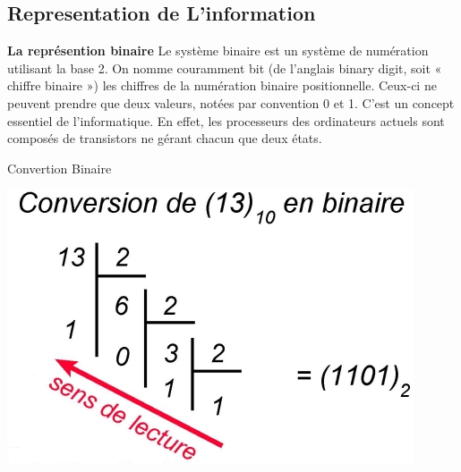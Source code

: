 \documentclass[a4paper, 12pt]{beamer}
\begin{document}
	\subsection{Representation de L'information}
	\begin{frame}
		\begin{block}{\textbf{La représention binaire}}
		Le système binaire est un système de numération utilisant la base 2. On nomme couramment bit (de l'anglais binary digit, soit « chiffre binaire ») les chiffres de la numération binaire positionnelle. Ceux-ci ne peuvent prendre que deux valeurs, notées par convention 0 et 1. C'est un concept essentiel de l'informatique. En effet, les processeurs des ordinateurs actuels sont composés de transistors ne gérant chacun que deux états.
\begin{block}{Convertion Binaire}
\vfill
\begin{center} \includegraphics[scale=0.2]{isn2.jpg} \end{center}
\vfill
\end{block}
		\end{block}
\end{frame}
		
\end{document}
